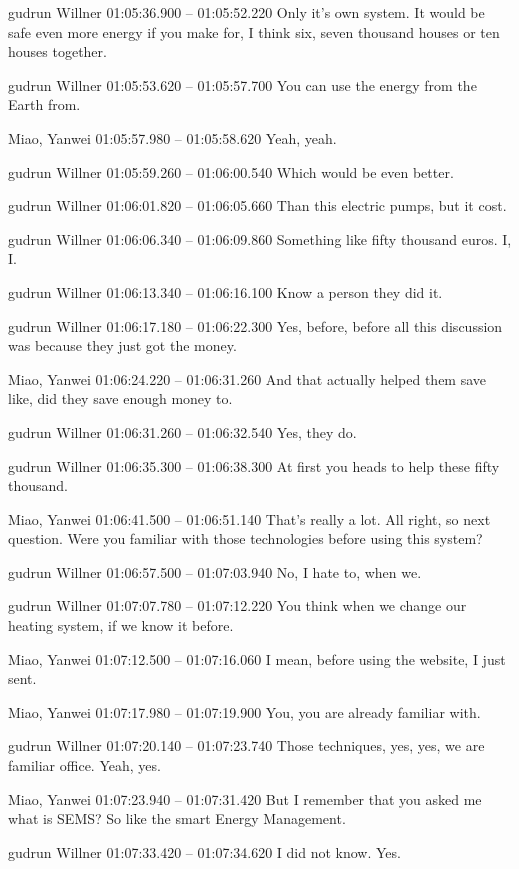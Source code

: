 {gudrun Willner 01:05:36.900 -- 01:05:52.220
Only it's own system. It would be safe even more energy if you make for, I think six, seven thousand houses or ten houses together.

gudrun Willner 01:05:53.620 -- 01:05:57.700
You can use the energy from the Earth from.

Miao, Yanwei 01:05:57.980 -- 01:05:58.620
Yeah, yeah.

gudrun Willner 01:05:59.260 -- 01:06:00.540
Which would be even better.

gudrun Willner 01:06:01.820 -- 01:06:05.660
Than this electric pumps, but it cost.

gudrun Willner 01:06:06.340 -- 01:06:09.860
Something like fifty thousand euros. I, I.

gudrun Willner 01:06:13.340 -- 01:06:16.100
Know a person they did it.

gudrun Willner 01:06:17.180 -- 01:06:22.300
Yes, before, before all this discussion was because they just got the money.

Miao, Yanwei 01:06:24.220 -- 01:06:31.260
And that actually helped them save like, did they save enough money to.

gudrun Willner 01:06:31.260 -- 01:06:32.540
Yes, they do.

gudrun Willner 01:06:35.300 -- 01:06:38.300
At first you heads to help these fifty thousand.

Miao, Yanwei 01:06:41.500 -- 01:06:51.140
That's really a lot. All right, so next question. Were you familiar with those technologies before using this system?

gudrun Willner 01:06:57.500 -- 01:07:03.940
No, I hate to, when we.

gudrun Willner 01:07:07.780 -- 01:07:12.220
You think when we change our heating system, if we know it before.

Miao, Yanwei 01:07:12.500 -- 01:07:16.060
I mean, before using the website, I just sent.

Miao, Yanwei 01:07:17.980 -- 01:07:19.900
You, you are already familiar with.

gudrun Willner 01:07:20.140 -- 01:07:23.740
Those techniques, yes, yes, we are familiar office. Yeah, yes.

Miao, Yanwei 01:07:23.940 -- 01:07:31.420
But I remember that you asked me what is SEMS? So like the smart Energy Management.

gudrun Willner 01:07:33.420 -- 01:07:34.620
I did not know. Yes.

}
